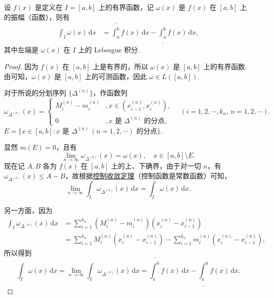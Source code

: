 \documentclass[../../main.tex]{subfiles}
\begin{document}
\begin{lemma}\label{lemma:引理4.23}
设 \( f(x) \) 是定义在 \( I = [a,b] \) 上的有界函数，记 \( \omega(x) \) 是 \( f(x) \) 在 \( [a,b] \) 上的振幅（函数），则有
\begin{align*}
\int_I \omega(x) \, \mathrm{d}x &= \overline{\int_a^b} f(x) \, \mathrm{d}x - \underline{\int_a^b} f(x) \, \mathrm{d}x,
\end{align*}
其中左端是 \( \omega(x) \) 在 \( I \) 上的 Lebesgue 积分.
\end{lemma}
\begin{proof}
因为 \( f(x) \) 在 \( [a,b] \) 上是有界的，所以 \( \omega(x) \) 是 \( [a,b] \) 上的有界函数. 由可知，\( \omega(x) \) 是 \( [a,b] \) 上的可测函数，因此 \( \omega \in L([a,b]) \).

对于所说的分划序列 \( \{\Delta^{(n)}\} \)，作函数列
\[
\omega_{\Delta^{(n)}}(x) = 
\begin{cases} 
M_i^{(n)} - m_i^{(n)} &, x \in (x_{i-1}^{(n)}, x_i^{(n)}), \\
0 & ,x \text{ 是 } \Delta^{(n)} \text{ 的分点},
\end{cases}
\quad (i = 1,2,\cdots,k_n,\, n = 1,2,\cdots).
\]
\( E = \{ x \in [a,b] : x \text{ 是 } \Delta^{(n)} \, (n = 1,2,\cdots) \text{ 的分点} \} \).

显然 \( m(E) = 0 \)，且有
\[
\lim_{n \to \infty} \omega_{\Delta^{(n)}}(x) = \omega(x), \quad x \in [a,b] \setminus E.
\]
现在记 \( A,B \) 各为 \( f(x) \) 在 \( [a,b] \) 上的上、下确界，由于对一切 \( n \)，有 \( \omega_{\Delta^{(n)}}(x) \leqslant  A - B \)，故根据\hyperref[theorem:控制收敛定理]{控制收敛定理}（控制函数是常数函数）可知，
\[
\lim_{n \to \infty} \int_I \omega_{\Delta^{(n)}}(x) \, \mathrm{d}x = \int_I \omega(x) \, \mathrm{d}x.
\]

另一方面，因为
\begin{align*}
\int_I \omega_{\Delta^{(n)}}(x) \, \mathrm{d}x &= \sum_{i=1}^{k_n} (M_i^{(n)} - m_i^{(n)})(x_i^{(n)} - x_{i-1}^{(n)}) \\
&= \sum_{i=1}^{k_n} M_i^{(n)}(x_i^{(n)} - x_{i-1}^{(n)}) - \sum_{i=1}^{k_n} m_i^{(n)}(x_i^{(n)} - x_{i-1}^{(n)}),
\end{align*}
所以得到
\[
\int_I \omega(x) \, \mathrm{d}x = \lim_{n \to \infty} \int_I \omega_{\Delta^{(n)}}(x) \, \mathrm{d}x = \overline{\int_a^b} f(x) \, \mathrm{d}x - \underline{\int_a^b} f(x) \, \mathrm{d}x.
\]
\end{proof}
\end{document}
